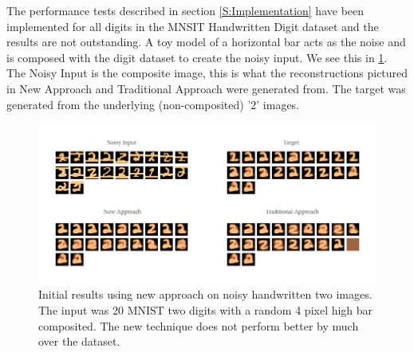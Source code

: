 The performance tests described in section \ref{S:Implementation} have been implemented for all digits in the MNSIT Handwritten Digit dataset \cite{mnistlecun} and the results are not outstanding. A toy model of a horizontal bar acts as the noise and is composed with the digit dataset to create the noisy input. We see this in \ref{F:digit_example}. The Noisy Input is the composite image, this is what the reconstructions pictured in New Approach and Traditional Approach were generated from. The target was generated from the underlying (non-composited) '2' images. 

\begin{figure}[htbp]
\begin{center}
\includegraphics[width=1\textwidth]{Assets/Initial_Results}
\caption[Initial results using new approach on noisy handwritten two images.]{Initial results using new approach on noisy handwritten two images. The input was 20 MNIST two digits with a random 4 pixel high bar composited. The new technique does not perform better by much over the dataset.  }
\label{F:digit_example}
\end{center}
\end{figure}



